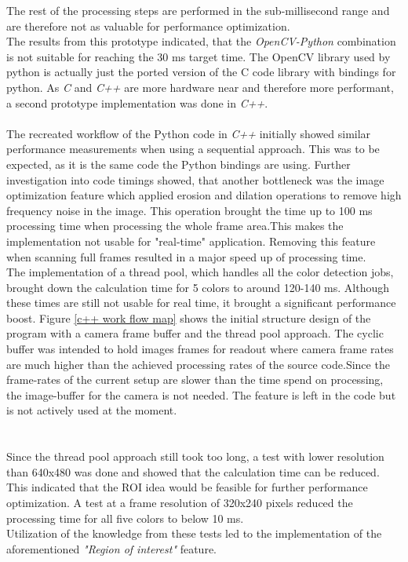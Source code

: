 The rest of the processing steps are performed in the sub-millisecond range and are therefore not as valuable for performance optimization.
\\The results from this prototype indicated, that the \textit{OpenCV-Python} combination is not suitable for reaching the 30 ms target time. The OpenCV library used by python is actually just the ported version of the C code library with bindings for python. As \textit{C} and \textit{C++} are more hardware near and therefore more performant, a second prototype implementation was done in \textit{C++}.
\\\\The recreated workflow of the Python code in\textit{ C++} initially showed similar performance measurements when using a sequential approach. This was to be expected, as it is the same code the Python bindings are using. Further investigation into code timings showed, that another bottleneck was the image optimization feature which applied erosion and dilation operations to remove high frequency noise in the image. This operation brought the time up to 100 ms processing time when processing the whole frame area.This  makes the implementation not usable for "real-time" application. Removing this feature when scanning full frames resulted in a major speed up of processing time. \\
The implementation of a thread pool, which handles all the color detection jobs, brought down the calculation time for 5 colors to around 120-140 ms. Although these times are still not usable for real time, it brought a significant performance boost. Figure \ref{c++ work flow map} shows the initial structure design of the program with a camera frame buffer and the thread pool approach. The cyclic buffer was intended to hold images frames for readout where camera frame rates are much higher than the achieved processing rates of the source code.Since the frame-rates of the current setup are slower than the time spend on processing, the image-buffer for the camera is not needed. The feature is left in the code but is not actively used at the moment.\\
\\\\Since the thread pool approach still took too long, a test with lower resolution than 640x480 was done and showed that the calculation time can be reduced. This indicated that the ROI idea would be feasible for further performance optimization. A test at a frame resolution of 320x240 pixels reduced the processing time for all five colors to below 10 ms.\\Utilization of the knowledge from these tests led to the implementation of the aforementioned\textit{ "Region of interest"} feature.
